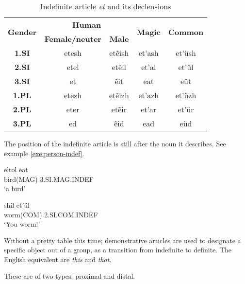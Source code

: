 \begin{table}[h]
\begin{center}\label{tab:morph-indef-pers-suff}
\begin{tabular}{|c||c|c|c|c|}
\hline
\multirow{2}{*}{\textbf{Gender}} & \multicolumn{2}{|c|}{\textbf{Human}} & \multirow{2}{*}{\textbf{Magic}} & \multirow{2}{*}{\textbf{Common}}\\
                                 & \textbf{Female/neuter} & \textbf{Male} & & \\\hline\hline
\textbf{1.SI}                    & etesh & etẽish & et’ash & et’üsh \\\hline
\textbf{2.SI}                    & etel  & etẽil  & et’al  & et’ül  \\\hline
\textbf{3.SI}                    & et    & ẽit    & eat    & eüt    \\\hline
\textbf{1.PL}                    & etezh & etẽizh & et’azh & et’üzh \\\hline
\textbf{2.PL}                    & eter  & etẽir  & et’ar  & et’ür  \\\hline
\textbf{3.PL}                    & ed    & ẽid    & ead    & eüd    \\\hline
\end{tabular}
\end{center}
\caption{Indefinite article \emph{et} and its declensions}
\end{table}

The position of the indefinite article is still after the noun it describes. See example
\ref{exe:person-indef}.

\begin{exe}
\ex\label{exe:person-indef}
\begin{xlist}
\ex\gll \gls{eltol} eat\\
bird(MAG) 3.SI.MAG.INDEF\\
\trans ‘a bird’

\ex\gll {}\gls{shil} et’ül\\
worm(COM) 2.SI.COM.INDEF\\
\trans ‘You worm!’
\end{xlist}
\end{exe}

Without a pretty table this time; demonstrative articles are used to designate a specific object out
of a group, as a transition from indefinite to definite. The English equivalent are \emph{this} and
\emph{that}.

These are of two types: proximal and distal.


